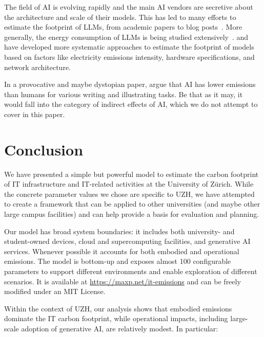 \documentclass[11pt]{article}
\let\cite\parencite
\begin{document}
The field of AI is evolving rapidly and the main AI vendors are secretive about the architecture and scale of their models. This has led to many efforts to estimate the footprint of LLMs, from academic papers to blog posts~\cite{devries2023growing,heguerte2023estimate,luccioni2022estimating,ritchie:chatgpt,epoch2025howmuchenergydoeschatgptuse}. More generally, the energy consumption of LLMs is being studied extensively~\cite{budennyy2022eco2ai,castano2023exploring,epoch2024optimallyallocatingcomputebetweeninferenceandtraining,gowda2024watt,harding2024watts,luccioni2023counting,patterson2021carbon,rodriguez2024evaluating,tripp2024measuring}. \textcite{lacoste:mlco2} and \textcite{faiz2024llmcarbon} have developed more systematic approaches to estimate the footprint of models based on factors like electricity emissions intensity, hardware specifications, and network architecture.

In a provocative and maybe dystopian paper, \textcite{tomlinson:2024:carbon} argue that AI has lower emissions than humans for various writing and illustrating tasks. Be that as it may, it would fall into the category of indirect effects of AI, which we do not attempt to cover in this paper.

\section{Conclusion}

We have presented a simple but powerful model to estimate the carbon footprint of IT infrastructure and IT-related activities at the University of Zürich. While the concrete parameter values we chose are specific to UZH, we have attempted to create a framework that can be applied to other universities (and maybe other large campus facilities) and can help provide a basis for evaluation and planning.

Our model has broad system boundaries: it includes both university- and student-owned devices, cloud and supercomputing facilities, and generative AI services. Whenever possible it accounts for both embodied and operational emissions. The model is bottom-up and exposes almost 100 configurable parameters to support different environments and enable exploration of different scenarios. It is available at \url{https://maxp.net/it-emissions} and can be freely modified under an MIT License.

Within the context of UZH, our analysis shows that embodied emissions dominate the IT carbon footprint, while operational impacts, including large-scale adoption of generative AI, are relatively modest. In particular:
\end{document}
